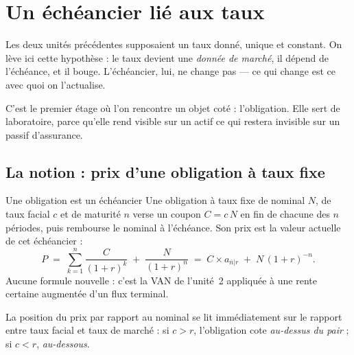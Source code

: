 \section{Un échéancier lié aux taux}
\label{sec:U3}

Les deux unités précédentes supposaient un taux donné, unique et constant. On
lève ici cette hypothèse : le taux devient une \emph{donnée de marché}, il dépend
de l'échéance, et il bouge. L'échéancier, lui, ne change pas --- ce qui change
est ce avec quoi on l'actualise.

C'est le premier étage où l'on rencontre un objet coté : l'obligation. Elle sert
de laboratoire, parce qu'elle rend visible sur un actif ce qui restera invisible
sur un passif d'assurance.

\subsection{La notion : prix d'une obligation à taux fixe}

\begin{notion}{Une obligation est un échéancier}
Une obligation à taux fixe de nominal $N$, de taux facial $c$ et de maturité $n$
verse un coupon $C = c\,N$ en fin de chacune des $n$ périodes, puis rembourse le
nominal à l'échéance. Son prix est la valeur actuelle de cet échéancier :
\[
  P \;=\; \sum_{k=1}^{n} \frac{C}{(1+r)^{k}} \;+\; \frac{N}{(1+r)^{n}}
      \;=\; C \times a_{\overline{n}|r} \;+\; N\,(1+r)^{-n}.
\]
Aucune formule nouvelle : c'est la VAN de l'unité~2 appliquée à une rente
certaine augmentée d'un flux terminal.

\medskip
La position du prix par rapport au nominal se lit immédiatement sur le rapport
entre taux facial et taux de marché : si $c > r$, l'obligation cote
\emph{au-dessus du pair} ; si $c < r$, \emph{au-dessous}.
\end{notion}

\begin{center}
\end{center}

